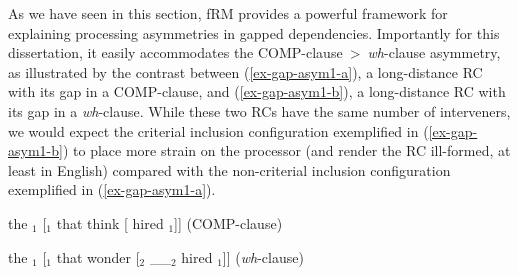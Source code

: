 As we have seen in this section, fRM provides a powerful framework for explaining processing asymmetries in gapped dependencies. Importantly for this dissertation, it easily accommodates the COMP-clause~>~\textit{wh}-clause asymmetry, as illustrated by the contrast between (\ref{ex-gap-asym1-a}), a long-distance RC with its gap in a COMP-clause, and (\ref{ex-gap-asym1-b}), a long-distance RC with its gap in a \textit{wh}-clause. While these two RCs have the same number of interveners, we would expect the criterial inclusion configuration exemplified in (\ref{ex-gap-asym1-b}) to place more strain on the processor (and render the RC ill-formed, at least in English) compared with the non-criterial inclusion configuration exemplified in (\ref{ex-gap-asym1-a}). 

\pex \label{ex-gap-asym1}
\a
the $_1$ [$_1$ that  think [ hired $_1$]] (COMP-clause)
\par\nobreak\vspace{20pt}\label{ex-gap-asym1-a}
\a
\ljudge*the $_1$ [$_1$ that  wonder [$_2$ \_\_$_2$ hired $_1$]] (\textit{wh}-clause)
\par\nobreak\vspace{24pt}\label{ex-gap-asym1-b}
\xe

